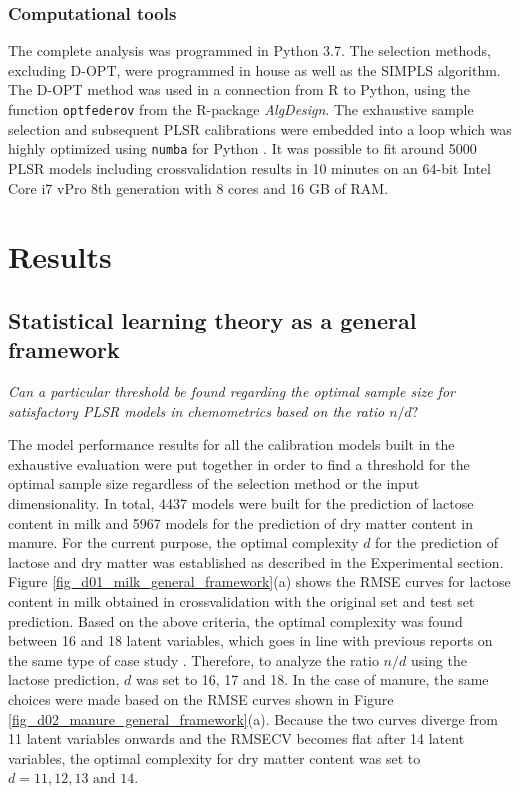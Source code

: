 \documentclass[journal=ancham,manuscript=article]{achemso}
\begin{document}
\subsubsection{Computational tools}

The complete analysis was programmed in Python 3.7. The selection methods, excluding D-OPT, were programmed in house as well as the SIMPLS algorithm. The D-OPT method was used in a connection from R to Python, using the function \texttt{optfederov} from the R-package \emph{AlgDesign}\cite{Wheeler2019}. The exhaustive sample selection and subsequent PLSR calibrations were embedded into a loop which was highly optimized using \texttt{numba} for Python \cite{Lam2015}. It was possible to fit around 5000 PLSR models including crossvalidation results in 10 minutes on an 64-bit Intel Core i7 vPro 8th generation with 8 cores and 16 GB of RAM. 



\section*{Results}\label{results}

\subsection*{Statistical learning theory as a general framework}\label{results:genframework}

\emph{Can a particular threshold be found regarding the optimal sample size for satisfactory PLSR models in chemometrics based on the ratio $n/d?$}

The model performance results for all the calibration models built in the exhaustive evaluation were put together in order to find a threshold for the optimal sample size regardless of the selection method or the input dimensionality. In total, 4437 models were built for the prediction of lactose content in milk and 5967 models for the prediction of dry matter content in manure. For the current purpose, the optimal complexity $d$ for the prediction of lactose and dry matter was established as described in the Experimental section. Figure \ref{fig_d01_milk_general_framework}(a) shows the RMSE curves for lactose content in milk obtained in crossvalidation with the original set and test set prediction. Based on the above criteria, the optimal complexity was found between 16 and 18 latent variables, which goes in line with previous reports on the same type of case study \cite{Diaz-Olivares2020}. Therefore, to analyze the ratio $n/d$ using the lactose prediction, $d$ was set to 16, 17 and 18. In the case of manure, the same choices were made based on the RMSE curves shown in Figure \ref{fig_d02_manure_general_framework}(a). Because the two curves diverge from 11 latent variables onwards and the RMSECV becomes flat after 14 latent variables, the optimal complexity for dry matter content was set to $d = 11,12,13 \text{ and } 14$\cite{Saeys2005}. 
\end{document}
